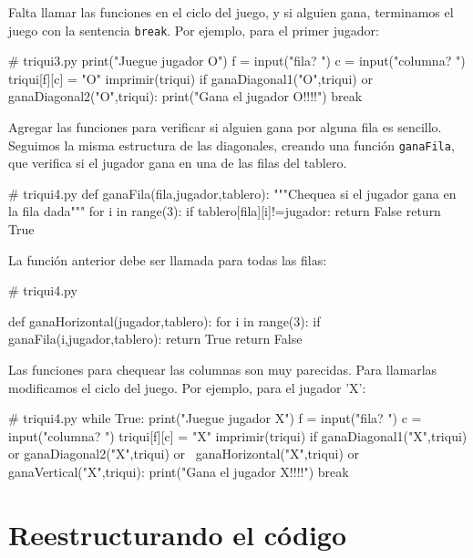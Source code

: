 Falta llamar las funciones en el ciclo del juego, y si alguien gana,
terminamos el juego con la sentencia \texttt{break}. Por ejemplo,
para el primer jugador:

\begin{pythoncode}
# triqui3.py
print("Juegue jugador O")
    f = input("fila? ")
    c = input("columna? ")
    triqui[f][c] = "O"
    imprimir(triqui)
    if ganaDiagonal1("O",triqui) or ganaDiagonal2("O",triqui):
        print("Gana el jugador O!!!!")
        break
\end{pythoncode}

Agregar las funciones para verificar si alguien gana por alguna fila
es sencillo. Seguimos la misma estructura de las diagonales, creando
una función \texttt{ganaFila}, que verifica si el jugador gana en
una de las filas del tablero.

\begin{pythoncode}
# triqui4.py
def ganaFila(fila,jugador,tablero):
    """Chequea si el jugador gana en la fila dada"""
    for i in range(3):
        if tablero[fila][i]!=jugador:
            return False
    return True
\end{pythoncode}

La función anterior debe ser llamada para todas las filas:

\begin{pythoncode}
# triqui4.py

def ganaHorizontal(jugador,tablero):
    for i in range(3):
        if ganaFila(i,jugador,tablero):
            return True
    return False
\end{pythoncode}

Las funciones para chequear las columnas son muy parecidas. Para llamarlas
modificamos el ciclo del juego. Por ejemplo, para el jugador 'X':

\begin{pythoncode}
# triqui4.py
while True:
    print("Juegue jugador X")
    f = input("fila? ")
    c = input("columna? ")
    triqui[f][c] = "X"
    imprimir(triqui)
    if ganaDiagonal1("X",triqui) or ganaDiagonal2("X",triqui) or \
       ganaHorizontal("X",triqui) or ganaVertical("X",triqui):
        print("Gana el jugador X!!!!")
        break
\end{pythoncode}

\section{Reestructurando el código}

